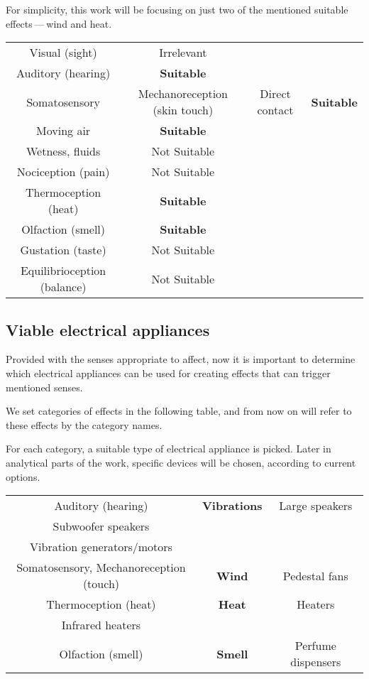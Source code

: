 For simplicity, this work will be focusing on just two of the mentioned suitable
effects — wind and heat.


\begin{center}
\begin{tabular}{|c|c|c|c|}
\hline
Visual (sight) & Irrelevant \\ 
Auditory (hearing) & \textbf{Suitable} \\ 
Somatosensory & Mechanoreception (skin touch) & Direct contact & \textbf{Suitable} \\ 
Moving air & \textbf{Suitable} \\ 
Wetness, fluids & Not Suitable \\ 
Nociception (pain) & Not Suitable \\ 
Thermoception (heat) & \textbf{Suitable} \\ 
Olfaction (smell) & \textbf{Suitable} \\ 
Gustation (taste) & Not Suitable \\ 
Equilibrioception (balance) & Not Suitable \\ 
\hline
\end{tabular}
\end{center}

\hypertarget{x-viable-electrical-appliances}{\subsection*{Viable electrical appliances}}
Provided with the senses appropriate to affect, now it is important to determine
which electrical appliances can be used for creating effects that can trigger mentioned senses.


We set categories of effects in the following table, and from now on will
refer to these effects by the category names.


For each category, a suitable type of electrical appliance is picked. Later in
analytical parts of the work, specific devices will be chosen, according to
current options.


\begin{center}
\begin{tabular}{|c|c|c|}
\hline
Auditory (hearing) & \textbf{Vibrations} & Large speakers \\ 
Subwoofer speakers \\ 
Vibration generators/motors \\ 
Somatosensory, Mechanoreception (touch) & \textbf{Wind} & Pedestal fans \\ 
Thermoception (heat) & \textbf{Heat} & Heaters \\ 
Infrared heaters \\ 
Olfaction (smell) & \textbf{Smell} & Perfume dispensers \\ 
\hline
\end{tabular}
\end{center}

